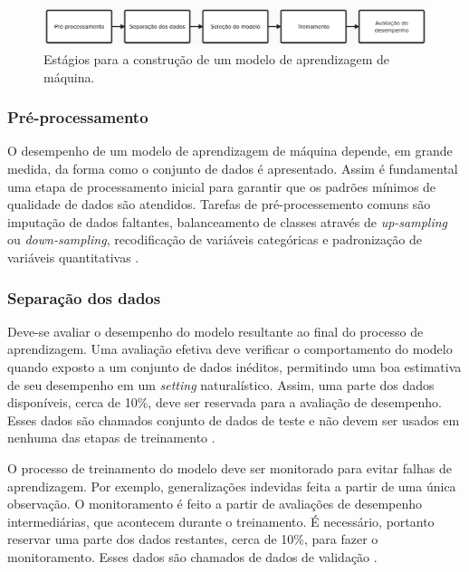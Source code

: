\begin{figure}[h!]
    \centering
    \includegraphics[width=\textwidth]{./02-desenvolvimento/01-machine-learning/imagens/processo.png}
    \caption{Estágios para a construção de um modelo de aprendizagem de máquina.}
    \label{fig:processo}
\end{figure}

\subsubsection{Pré-processamento}

O desempenho de um modelo de aprendizagem de máquina depende, em grande medida, da forma como o conjunto de dados é apresentado. Assim é fundamental uma etapa
de processamento inicial para garantir que os padrões mínimos de qualidade de dados são atendidos. Tarefas de pré-processemento comuns são imputação de dados
faltantes, balanceamento de classes através de \textit{up-sampling} ou \textit{down-sampling}, recodificação de variáveis categóricas e padronização
de variáveis quantitativas \cite{Delgadillo2020}.

\subsubsection{Separação dos dados}

Deve-se avaliar o desempenho do modelo resultante ao final do processo de aprendizagem. Uma avaliação efetiva deve verificar o comportamento do modelo quando
exposto a um conjunto de dados inéditos, permitindo uma boa estimativa de seu desempenho em um \textit{setting} naturalístico. Assim, uma parte dos dados
disponíveis, cerca de 10\%, deve ser reservada para a avaliação de desempenho. Esses dados são chamados conjunto de dados de teste e não devem ser usados
em nenhuma das etapas de treinamento \cite{Greener2021}. 

O processo de treinamento do modelo deve ser monitorado para evitar falhas de aprendizagem. Por exemplo, generalizações indevidas feita a partir de uma única
observação.  O monitoramento é feito a partir de avaliações de desempenho intermediárias, que acontecem durante o treinamento. É necessário, portanto reservar
uma parte dos dados restantes, cerca de 10\%, para fazer o monitoramento. Esses dados são chamados de dados de validação \cite{Greener2021}.

